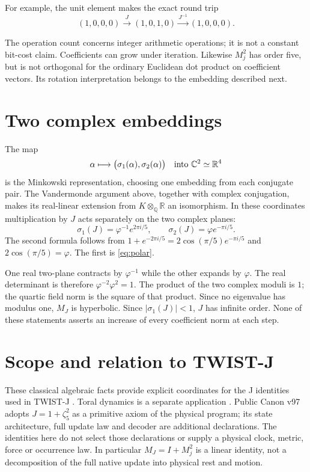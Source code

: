 \documentclass[11pt,a4paper]{article}
\newcommand{\Q}{\mathbb Q}
\newcommand{\ph}{\varphi}
\begin{document}
For example, the unit element makes the exact round trip
\begin{equation}\label{eq:example}
 (1,0,0,0)\xrightarrow{J}(1,0,1,0)
 \xrightarrow{J^{-1}}(1,0,0,0).
\end{equation}

The operation count concerns integer arithmetic operations; it is not
a constant bit-cost claim. Coefficients can grow under iteration.
Likewise $M_j^2$ has order five, but is not orthogonal for the ordinary
Euclidean dot product on coefficient vectors. Its rotation interpretation
belongs to the embedding described next.

\section{Two complex embeddings}\label{sec:embeddings}
The map
\[
 \alpha\longmapsto\bigl(\sigma_1(\alpha),\sigma_2(\alpha)\bigr)
 \quad\hbox{into }\mathbb C^2\simeq\mathbb R^4
\]
is the Minkowski representation, choosing one embedding from each
conjugate pair. The Vandermonde argument above, together with complex
conjugation, makes its real-linear extension from $K\otimes_{\Q}\mathbb R$
an isomorphism. In these coordinates multiplication by $J$ acts
separately on the two complex planes:
\begin{equation}\label{eq:embeddings}
 \sigma_1(J)=\ph^{-1}e^{2\pi i/5},\qquad
 \sigma_2(J)=\ph e^{-\pi i/5}.
\end{equation}
The second formula follows from
$1+e^{-2\pi i/5}=2\cos(\pi/5)e^{-\pi i/5}$ and
$2\cos(\pi/5)=\ph$. The first is \eqref{eq:polar}.

One real two-plane contracts by $\ph^{-1}$ while the other expands
by $\ph$. The real determinant is therefore
$\ph^{-2}\ph^2=1$. The product of the two complex moduli is $1$;
the quartic field norm is the square of that product. Since no
eigenvalue has modulus one, $M_J$ is hyperbolic. Since
$|\sigma_1(J)|<1$, $J$ has infinite order. None of these statements
asserts an increase of every coefficient norm at each step.

\section{Scope and relation to TWIST-J}\label{sec:scope}
These classical algebraic facts provide explicit coordinates for the
J identities used in TWIST-J \cite{canon}. Toral dynamics is a separate
application \cite{hyperbolic}. Public Canon v97 adopts $J=1+\zeta_5^2$
as a primitive axiom of the physical program; its state architecture,
full update law and decoder are additional declarations. The identities
here do not select those declarations or supply a physical clock,
metric, force or occurrence law. In particular $M_J=I+M_j^2$ is a
linear identity, not a decomposition of the full native update into
physical rest and motion.
\end{document}
